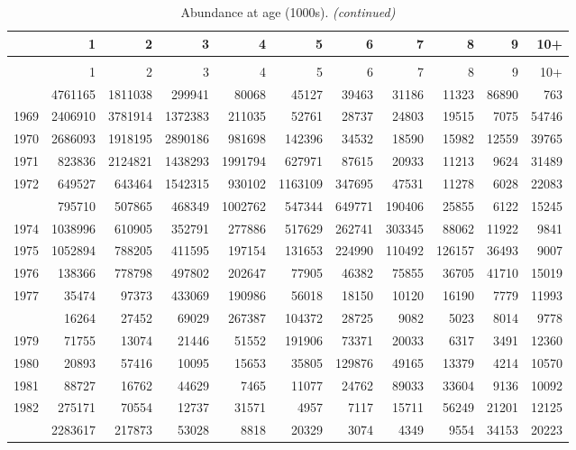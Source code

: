 \documentclass[
]{article}
\begin{document}
\begin{longtable}[t]{lrrrrrrrrrr}
\caption{\label{tab:NAA-table}Abundance at age (1000s).}\\
\toprule
  & 1 & 2 & 3 & 4 & 5 & 6 & 7 & 8 & 9 & 10+\\
\midrule
\endfirsthead
\caption[]{Abundance at age (1000s). \textit{(continued)}}\\
\toprule
  & 1 & 2 & 3 & 4 & 5 & 6 & 7 & 8 & 9 & 10+\\
\midrule
\endhead

\endfoot
\bottomrule
\endlastfoot
1968 & 4761165 & 1811038 & 299941 & 80068 & 45127 & 39463 & 31186 & 11323 & 86890 & 763\\
1969 & 2406910 & 3781914 & 1372383 & 211035 & 52761 & 28737 & 24803 & 19515 & 7075 & 54746\\
1970 & 2686093 & 1918195 & 2890186 & 981698 & 142396 & 34532 & 18590 & 15982 & 12559 & 39765\\
1971 & 823836 & 2124821 & 1438293 & 1991794 & 627971 & 87615 & 20933 & 11213 & 9624 & 31489\\
1972 & 649527 & 643464 & 1542315 & 930102 & 1163109 & 347695 & 47531 & 11278 & 6028 & 22083\\
\addlinespace
1973 & 795710 & 507865 & 468349 & 1002762 & 547344 & 649771 & 190406 & 25855 & 6122 & 15245\\
1974 & 1038996 & 610905 & 352791 & 277886 & 517629 & 262741 & 303345 & 88062 & 11922 & 9841\\
1975 & 1052894 & 788205 & 411595 & 197154 & 131653 & 224990 & 110492 & 126157 & 36493 & 9007\\
1976 & 138366 & 778798 & 497802 & 202647 & 77905 & 46382 & 75855 & 36705 & 41710 & 15019\\
1977 & 35474 & 97373 & 433069 & 190986 & 56018 & 18150 & 10120 & 16190 & 7779 & 11993\\
\addlinespace
1978 & 16264 & 27452 & 69029 & 267387 & 104372 & 28725 & 9082 & 5023 & 8014 & 9778\\
1979 & 71755 & 13074 & 21446 & 51552 & 191906 & 73371 & 20033 & 6317 & 3491 & 12360\\
1980 & 20893 & 57416 & 10095 & 15653 & 35805 & 129876 & 49165 & 13379 & 4214 & 10570\\
1981 & 88727 & 16762 & 44629 & 7465 & 11077 & 24762 & 89033 & 33604 & 9136 & 10092\\
1982 & 275171 & 70554 & 12737 & 31571 & 4957 & 7117 & 15711 & 56249 & 21201 & 12125\\
\addlinespace
1983 & 2283617 & 217873 & 53028 & 8818 & 20329 & 3074 & 4349 & 9554 & 34153 & 20223\\

\end{longtable}
\end{document}
